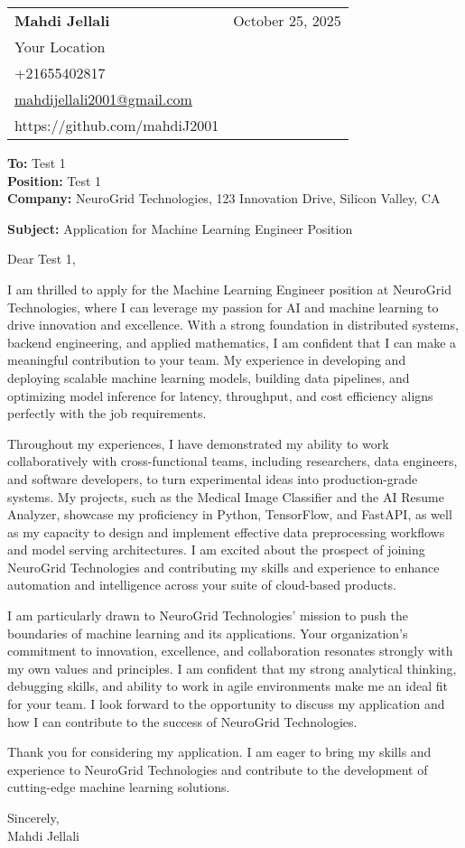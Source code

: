 \documentclass[letterpaper,11pt]{article}
\makeatletter
\newcommand{\letterHeading}[5]{
    \begin{tabular*}{\textwidth}{l@{\extracolsep{\fill}}r}
    \textbf{\Large #1} & #5 \\  %
    #2 & \\
    #3 & \\
    #4 & \\
    \end{tabular*}
    \vspace{15pt}
}
\newcommand{\letterRecipient}[3]{
    \textbf{\large To:} #1 \\
    \textbf{\large Position:} #2 \\
    \textbf{\large Company:} #3 \\
    \vspace{12pt}
}
\newcommand{\letterSubject}[1]{
    \textbf{\large Subject:} #1 \\
    \vspace{15pt}
}
\makeatother
\begin{document}
    \letterHeading
    {Mahdi Jellali}
    {Your Location}
    {+21655402817 \\ \href{mailto:mahdijellali2001@gmail.com}{mahdijellali2001@gmail.com}}
    {https://github.com/mahdiJ2001}
    {October 25, 2025}

    \letterRecipient
    {Test 1}
    {Test 1 }
    {NeuroGrid Technologies, 123 Innovation Drive, Silicon Valley, CA}

    \letterSubject{Application for Machine Learning Engineer Position}

    Dear Test 1,

    I am thrilled to apply for the Machine Learning Engineer position at NeuroGrid Technologies, where I can leverage my passion for AI and machine learning to drive innovation and excellence. With a strong foundation in distributed systems, backend engineering, and applied mathematics, I am confident that I can make a meaningful contribution to your team. My experience in developing and deploying scalable machine learning models, building data pipelines, and optimizing model inference for latency, throughput, and cost efficiency aligns perfectly with the job requirements.

    Throughout my experiences, I have demonstrated my ability to work collaboratively with cross-functional teams, including researchers, data engineers, and software developers, to turn experimental ideas into production-grade systems. My projects, such as the Medical Image Classifier and the AI Resume Analyzer, showcase my proficiency in Python, TensorFlow, and FastAPI, as well as my capacity to design and implement effective data preprocessing workflows and model serving architectures. I am excited about the prospect of joining NeuroGrid Technologies and contributing my skills and experience to enhance automation and intelligence across your suite of cloud-based products.

    I am particularly drawn to NeuroGrid Technologies' mission to push the boundaries of machine learning and its applications. Your organization's commitment to innovation, excellence, and collaboration resonates strongly with my own values and principles. I am confident that my strong analytical thinking, debugging skills, and ability to work in agile environments make me an ideal fit for your team. I look forward to the opportunity to discuss my application and how I can contribute to the success of NeuroGrid Technologies.

    Thank you for considering my application. I am eager to bring my skills and experience to NeuroGrid Technologies and contribute to the development of cutting-edge machine learning solutions.

    Sincerely,\\[12pt]

    Mahdi Jellali
\end{document}
